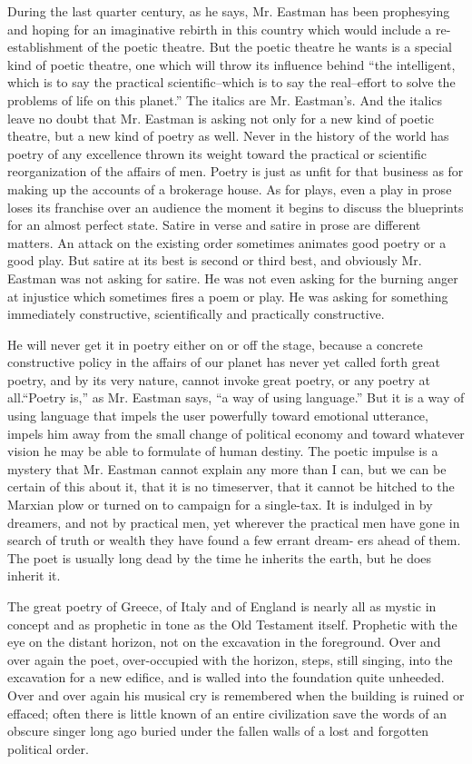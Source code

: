 \documentclass[9pt,twoside]{extarticle}
\begin{document}
During the last quarter century, as he says, Mr. Eastman has been prophesying and hoping for an imaginative rebirth in this country which would include a re-establishment of the poetic theatre. But the poetic theatre he wants is a special kind of poetic theatre, one which will throw its influence behind ``the intelligent, which is to say the practical scientific--which is to say the real--effort to solve the problems of life on this planet.'' The italics are Mr. Eastman's. And the italics leave no doubt that Mr. Eastman is asking not only for a new kind of poetic theatre, but a new kind of poetry as well. Never in the history of the world has poetry of any excellence thrown its weight toward the practical or scientific reorganization of the affairs of men. Poetry is just as unfit for that business as for making up the accounts of a brokerage house. As for plays, even a play in prose loses its franchise over an audience the moment it begins to discuss the blueprints for an almost perfect state. Satire in verse and satire in prose are different matters. An attack on the existing order sometimes animates good poetry or a good play. But satire at its best is second or third best, and obviously Mr. Eastman was not asking for satire. He was not even asking for the burning anger at injustice which sometimes fires a poem or play. He was asking for something immediately constructive, scientifically and practically constructive.

He will never get it in poetry either on or off the stage, because a concrete constructive policy in the affairs of our planet has never yet called forth great poetry, and by its very nature, cannot invoke great poetry, or any poetry at all.``Poetry is,'' as Mr. Eastman says, ``a way of using language.'' But it is a way of using language that impels the user powerfully toward emotional utterance, impels him away from the small change of political economy and toward whatever vision he may be able to formulate of human destiny. The poetic impulse is a mystery that Mr. Eastman cannot explain any more than I can, but we can be certain of this about it, that it is no timeserver, that it cannot be hitched to the Marxian plow or turned on to campaign for a single-tax. It is indulged in by dreamers, and not by practical men, yet wherever the practical men have gone in search of truth or wealth they have found a few errant dream- ers ahead of them. The poet is usually long dead by the time he inherits the earth, but he does inherit it.

The great poetry of Greece, of Italy and of England is nearly all as mystic in concept and as prophetic in tone as the Old Testament itself. Prophetic with the eye on the distant horizon, not on the excavation in the foreground. Over and over again the poet, over-occupied with the horizon, steps, still singing, into the excavation for a new edifice, and is walled into the foundation quite unheeded. Over and over again his musical cry is remembered when the building is ruined or effaced; often there is little known of an entire civilization save the words of an obscure singer long ago buried under the fallen walls of a lost and forgotten political order.
\end{document}

